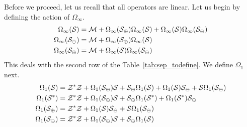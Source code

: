 \documentclass[12pt, a4paper, twoside]{report}
\begin{document}
Before we proceed, let us recall that all operators are linear. Let us begin by defining the action of $\Omega_\infty$. 
\begin{align}
  \begin{aligned}
    \Omega_\infty(\S)%
    &= \M + \Omega_\infty(\S_\oplus)\Omega_\infty(\S) + \Omega_\infty(\S)\Omega_\infty(\S_\ominus)\\
    \Omega_\infty(\S_\ominus) %
    &= \M + \Omega_\infty(\S_\oplus)\Omega_\infty(\S)\\
    \Omega_\infty(\S_\oplus) %
    &= \M + \Omega_\infty(\S)\Omega_\infty(\S_\ominus)
  \end{aligned}
\end{align}
This deals with the second row of the Table~\ref{tab:sep_todefine}. We define $\Omega_1$ next.
\begin{align}
  \begin{aligned}
    \Omega_1(\S) %
    &= \Zstar\Z + \Omega_1(\S_\oplus)\S + \S_\oplus\Omega_1(\S) + \Omega_1(\S)\S_\ominus + \S\Omega_1(\S_\ominus)\\
    \Omega_1(\Sstar) %
    &= \Zstar\Z + \Omega_1(\S_\oplus)\S + \S_\oplus\Omega_1(\Sstar) + \Omega_1(\Sstar)\S_\ominus\\
    \Omega_1(\S_\oplus) %
    &= \Zstar\Z + \Omega_1(\S)\S_\ominus + \S\Omega_1(\S_\ominus)\\
    \Omega_1(\S_\ominus) %
    &= \Zstar\Z + \Omega_1(\S_\oplus)\S + \S_\oplus\Omega_1(\S)
  \end{aligned}
\end{align}
\end{document}
